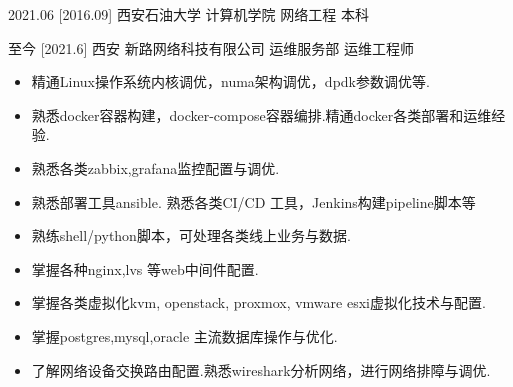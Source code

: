 \documentclass[zh]{resume}
\begin{document}
\begin{educations}
  \education%
    {2021.06}%
    [2016.09]%
    {西安石油大学}%
    {计算机学院}%
    {网络工程}%
    {本科}
\end{educations}
\begin{educations}
  \education%
    {至今}%
    [2021.6]%
    {西安}%
    {新路网络科技有限公司}%
    {运维服务部}%
    {运维工程师}
\end{educations}
\begin{itemize}
  \item 精通Linux操作系统内核调优，numa架构调优，dpdk参数调优等.
  \item 熟悉docker容器构建，docker-compose容器编排.精通docker各类部署和运维经验.
  \item 熟悉各类zabbix,grafana监控配置与调优.
  \item 熟悉部署工具ansible. 熟悉各类CI/CD 工具，Jenkins构建pipeline脚本等
  \item 熟练shell/python脚本，可处理各类线上业务与数据.
  \item 掌握各种nginx,lvs 等web中间件配置.
  \item 掌握各类虚拟化kvm, openstack, proxmox, vmware esxi虚拟化技术与配置.
  \item 掌握postgres,mysql,oracle 主流数据库操作与优化.
  \item 了解网络设备交换路由配置.熟悉wireshark分析网络，进行网络排障与调优.
\end{itemize}
\end{document}
